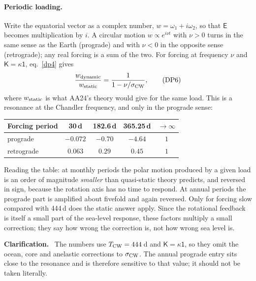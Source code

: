 \documentclass[11pt,a4paper]{article}
\newcommand{\E}{\mathsf{E}}
\newcommand{\Id}{\mathsf{1}}
\newcommand{\K}{\mathsf{K}}
\renewenvironment{leftbar}{%
  \def\FrameCommand{{\color{clarbar}\vrule width 2.5pt}\hspace{8pt}}%
  \MakeFramed{\advance\hsize-\width\FrameRestore}}%
  {\endMakeFramed}
\newenvironment{clar}{\begin{leftbar}\small\noindent\textbf{Clarification.}\ }{\end{leftbar}}
\begin{document}
\paragraph{Periodic loading.} Write the equatorial vector as a complex number,
$w=\omega_1+i\omega_2$, so that $\E$ becomes multiplication by $i$. A circular motion
$w\propto e^{i\nu t}$ with $\nu>0$ turns in the same sense as the Earth (prograde) and with $\nu<0$
in the opposite sense (retrograde); any real forcing is a sum of the two. For forcing at frequency
$\nu$ and $\K=\kappa\Id$, eq.~\eqref{dp4} gives
\begin{equation}
  \frac{w_{\rm dynamic}}{w_{\rm static}}=\frac{1}{1-\nu/\sigma_{\rm CW}} ,
  \tag{DP6}\label{dp6}
\end{equation}
where $w_{\rm static}$ is what AA24's theory would give for the same load. This is a resonance at
the Chandler frequency, and only in the prograde sense:
\begin{center}
\begin{tabular}{lcccc}
\toprule
Forcing period & 30\,d & 182.6\,d & 365.25\,d & $\to\infty$\\
\midrule
prograde & $-0.072$ & $-0.70$ & $-4.64$ & $1$\\
retrograde & $0.063$ & $0.29$ & $0.45$ & $1$\\
\bottomrule
\end{tabular}
\end{center}
Reading the table: at monthly periods the polar motion produced by a given load is an order of
magnitude \emph{smaller} than quasi-static theory predicts, and reversed in sign, because the
rotation axis has no time to respond. At annual periods the prograde part is amplified about
fivefold and again reversed. Only for forcing slow compared with 444\,d does the static answer
apply. Since the rotational feedback is itself a small part of the sea-level response, these
factors multiply a small correction; they say how wrong the correction is, not how wrong sea level
is.

\begin{clar}
The numbers use $T_{\rm CW}=444$\,d and $\K=\kappa\Id$, so they omit the ocean, core and anelastic
corrections to $\sigma_{\rm CW}$. The annual prograde entry sits close to the resonance and is
therefore sensitive to that value; it should not be taken literally.
\end{clar}
\end{document}
